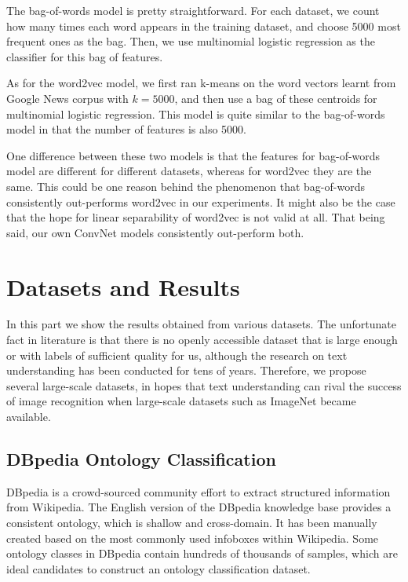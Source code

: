 \documentclass{article}
\begin{document}
\begin{CJK}{UTF8}{gbsn}
The bag-of-words model is pretty straightforward. For each dataset, we count how many times each word appears in the training dataset, and choose 5000 most frequent ones as the bag. Then, we use multinomial logistic regression as the classifier for this bag of features.

As for the word2vec model, we first ran k-means on the word vectors learnt from Google News corpus with \(k = 5000\), and then use a bag of these centroids for multinomial logistic regression. This model is quite similar to the bag-of-words model in that the number of features is also 5000.

One difference between these two models is that the features for bag-of-words model are different for different datasets, whereas for word2vec they are the same. This could be one reason behind the phenomenon that bag-of-words consistently out-performs word2vec in our experiments. It might also be the case that the hope for linear separability of word2vec is not valid at all. That being said, our own ConvNet models consistently out-perform both.

\section{Datasets and Results}

In this part we show the results obtained from various datasets. The unfortunate fact in literature is that there is no openly accessible dataset that is large enough or with labels of sufficient quality for us, although the research on text understanding has been conducted for tens of years. Therefore, we propose several large-scale datasets, in hopes that text understanding can rival the success of image recognition when large-scale datasets such as ImageNet\cite{DDSLLF09} became available.

\subsection{DBpedia Ontology Classification}

DBpedia is a crowd-sourced community effort to extract structured information from Wikipedia\cite{LIJJKMHMKAB114}. The English version of the DBpedia knowledge base provides a consistent ontology, which is shallow and cross-domain. It has been manually created based on the most commonly used infoboxes within Wikipedia. Some ontology classes in DBpedia contain hundreds of thousands of samples, which are ideal candidates to construct an ontology classification dataset.


\end{CJK}
\end{document}
